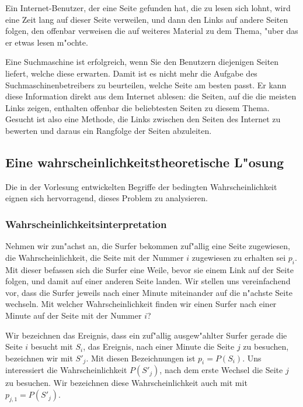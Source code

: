 Ein Internet-Benutzer, der eine Seite gefunden hat, die zu lesen sich lohnt,
wird eine Zeit lang auf dieser Seite verweilen, und dann den Links auf
andere Seiten folgen, den offenbar verweisen die auf weiteres Material zu
dem Thema, "uber das er etwas lesen m"ochte.

Eine Suchmaschine ist erfolgreich, wenn Sie den Benutzern diejenigen Seiten
liefert, welche diese erwarten. Damit ist es nicht mehr die Aufgabe des
Suchmaschinenbetreibers zu beurteilen, welche Seite am besten passt. Er
kann diese Information direkt aus dem Internet ablesen: die Seiten, auf die
die meisten Links zeigen, enthalten offenbar die beliebtesten Seiten zu diesem
Thema. Gesucht ist also eine Methode, die Links zwischen den Seiten des
Internet zu bewerten und daraus ein Rangfolge der Seiten abzuleiten.

\subsection{Eine wahrscheinlichkeitstheoretische L"osung}
Die in der Vorlesung entwickelten Begriffe der bedingten Wahrscheinlichkeit
eignen sich hervorragend, dieses Problem zu analysieren.

\subsubsection{Wahrscheinlichkeitsinterpretation}
Nehmen wir zun"achst an, die Surfer bekommen zuf"allig eine Seite zugewiesen,
die Wahrscheinlichkeit, die Seite mit der Nummer $i$ zugewiesen zu erhalten
sei $p_i$.
Mit dieser befassen sich die Surfer eine Weile, bevor sie einem Link auf
der Seite folgen, und damit auf einer anderen Seite landen. Wir stellen
uns vereinfachend vor, dass die Surfer jeweils nach einer Minute miteinander
auf die n"achste Seite wechseln. Mit welcher Wahrscheinlichkeit finden wir
einen Surfer nach einer Minute auf der Seite mit der Nummer $i$?

Wir bezeichnen das Ereignis, dass ein zuf"allig ausgew"ahlter Surfer gerade
die Seite $i$ besucht mit $S_i$, das Ereignis, nach einer Minute die Seite
$j$ zu besuchen, bezeichnen wir mit $S'_j$. Mit diesen Bezeichnungen ist
$p_i=P(S_i)$. Uns interessiert die Wahrscheinlichkeit $P(S'_j)$, nach dem erste
Wechsel die Seite $j$ zu besuchen.  Wir bezeichnen diese Wahrscheinlichkeit
auch mit mit $p_{j,1} = P(S'_j)$.

